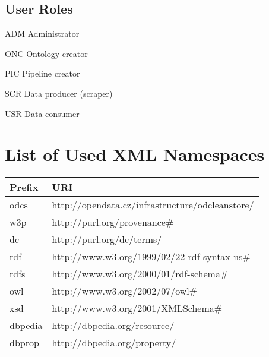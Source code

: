 \section*{User Roles}
\begin{glossarylist}
	\item[ADM] Administrator
	\item[ONC] Ontology creator
	\item[PIC] Pipeline creator
	\item[SCR] Data producer (scraper)
	\item[USR] Data consumer
\end{glossarylist}

\chapter{List of Used XML Namespaces}

\begin{table}[h!]
\centering
\begin{tabular}{|l|l|}
	\hline
	\ttfamily
	\textrm{\textbf{Prefix}} & \textrm{\textbf{URI}} \\
	\hline\hline
	odcs & http://opendata.cz/infrastructure/odcleanstore/ \\
	\hline
	w3p & http://purl.org/provenance\# \\
	\hline
	dc & http://purl.org/dc/terms/ \\
	\hline
	rdf & http://www.w3.org/1999/02/22-rdf-syntax-ns\# \\
	\hline
	rdfs & http://www.w3.org/2000/01/rdf-schema\# \\
	\hline
	owl & http://www.w3.org/2002/07/owl\# \\
	\hline
	xsd & http://www.w3.org/2001/XMLSchema\# \\
	\hline
	dbpedia & http://dbpedia.org/resource/ \\
	\hline
	dbprop & http://dbpedia.org/property/ \\
	\hline
\end{tabular}
\end{table} 


